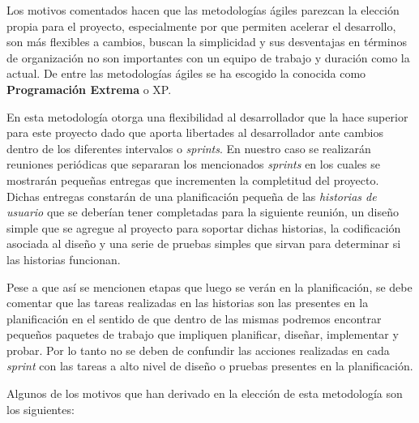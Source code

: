 \bigskip

Los motivos comentados hacen que las metodologías ágiles parezcan la elección propia para el proyecto, especialmente por que permiten acelerar el desarrollo, son más flexibles a cambios, buscan la simplicidad y sus desventajas en términos de organización no son importantes con un equipo de trabajo y duración como la actual. De entre las metodologías ágiles se ha escogido la conocida como \textbf{Programación Extrema} o XP.

\bigskip

En esta metodología otorga una flexibilidad al desarrollador que la hace superior para este proyecto dado que aporta libertades al desarrollador ante cambios dentro de los diferentes intervalos o \textit{sprints}. En nuestro caso se realizarán reuniones periódicas que separaran los mencionados \textit{sprints} en los cuales se mostrarán pequeñas entregas que incrementen la completitud del proyecto. Dichas entregas constarán de una planificación pequeña de las \textit{historias de usuario} que se deberían tener completadas para la siguiente reunión, un diseño simple que se agregue al proyecto para soportar dichas historias, la codificación asociada al diseño y una serie de pruebas simples que sirvan para determinar si las historias funcionan.

\bigskip

Pese a que así se mencionen etapas que luego se verán en la planificación, se debe comentar que las tareas realizadas en las historias son las presentes en la planificación en el sentido de que dentro de las mismas podremos encontrar pequeños paquetes de trabajo que impliquen planificar, diseñar, implementar y probar. Por lo tanto no se deben de confundir las acciones realizadas en cada \textit{sprint} con las tareas a alto nivel de diseño o pruebas presentes en la planificación.

\bigskip

Algunos de los motivos que han derivado en la elección de esta metodología son los siguientes:

